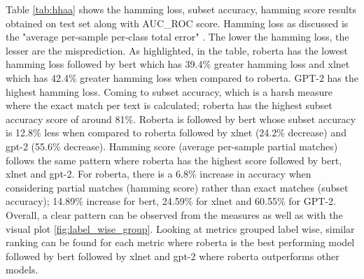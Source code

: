 Table \ref{tab:hhaa} shows the hamming loss, subset accuracy, hamming score results obtained on test set along with AUC\_ROC score. Hamming loss as discussed is the "average per-sample per-class total error" \cite{sokolova2009systematic}. The lower the hamming loss, the lesser are the misprediction. As highlighted, in the table, roberta has the lowest hamming loss followed by bert which has 39.4\% greater hamming loss and xlnet which has 42.4\% greater hamming loss when compared to roberta. GPT-2 has the highest hamming loss. Coming to subset accuracy, which is a harsh measure where the exact match per text is calculated; roberta has the highest subset accuracy score of around 81\%. Roberta is followed by bert whose subset accuracy is 12.8\% less when compared to roberta followed by xlnet (24.2\% decrease) and gpt-2 (55.6\% decrease). Hamming score (average per-sample partial matches) follows the same pattern where roberta has the highest score followed by bert, xlnet and gpt-2. For roberta, there is a 6.8\% increase in accuracy when considering partial matches (hamming score) rather than exact matches (subset accuracy); 14.89\% increase for bert, 24.59\% for xlnet and 60.55\% for GPT-2.
Overall, a clear pattern can be observed from the measures as well as with the visual plot \ref{fig:label_wise_group}. Looking at metrics grouped label wise, similar ranking can be found for each metric where roberta is the best performing model followed by bert followed by xlnet and gpt-2 where roberta outperforms other models.
\pagebreak

